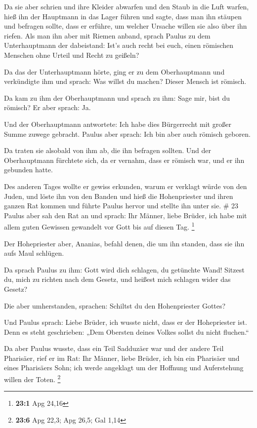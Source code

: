  Da sie aber schrien und ihre Kleider abwarfen und den
Staub in die Luft warfen,  hieß ihn der Hauptmann in das
Lager führen und sagte, dass man ihn stäupen und befragen sollte, dass
er erführe, um welcher Ursache willen sie also über ihn riefen.
 Als man ihn aber mit Riemen anband, sprach Paulus zu dem
Unterhauptmann der dabeistand: Ist's auch recht bei euch, einen
römischen Menschen ohne Urteil und Recht zu geißeln?

 Da das der Unterhauptmann hörte, ging er zu dem
Oberhauptmann und verkündigte ihm und sprach: Was willst du machen?
Dieser Mensch ist römisch.

 Da kam zu ihm der Oberhauptmann und sprach zu ihm: Sage
mir, bist du römisch? Er aber sprach: Ja.

 Und der Oberhauptmann antwortete: Ich habe dies
Bürgerrecht mit großer Summe zuwege gebracht. Paulus aber sprach: Ich
bin aber auch römisch geboren.

 Da traten sie alsobald von ihm ab, die ihn befragen
sollten. Und der Oberhauptmann fürchtete sich, da er vernahm, dass er
römisch war, und er ihn gebunden hatte.

 Des anderen Tages wollte er gewiss erkunden, warum er
verklagt würde von den Juden, und löste ihn von den Banden und hieß die
Hohenpriester und ihren ganzen Rat kommen und führte Paulus hervor und
stellte ihn unter sie. \# 23  Paulus aber sah den Rat an
und sprach: Ihr Männer, liebe Brüder, ich habe mit allem guten Gewissen
gewandelt vor Gott bis auf diesen Tag. \footnote{\textbf{23:1} Apg 24,16}

 Der Hohepriester aber, Ananias, befahl denen, die um ihn
standen, dass sie ihn aufs Maul schlügen.

 Da sprach Paulus zu ihm: Gott wird dich schlagen, du
getünchte Wand! Sitzest du, mich zu richten nach dem Gesetz, und heißest
mich schlagen wider das Gesetz?

 Die aber umherstanden, sprachen: Schiltst du den
Hohenpriester Gottes?

 Und Paulus sprach: Liebe Brüder, ich wusste nicht, dass
er der Hohepriester ist. Denn es steht geschrieben: „Dem Obersten deines
Volkes sollst du nicht fluchen.``

 Da aber Paulus wusste, dass ein Teil Sadduzäer war und
der andere Teil Pharisäer, rief er im Rat: Ihr Männer, liebe Brüder, ich
bin ein Pharisäer und eines Pharisäers Sohn; ich werde angeklagt um der
Hoffnung und Auferstehung willen der Toten. \footnote{\textbf{23:6} Apg
  22,3; Apg 26,5; Gal 1,14}


